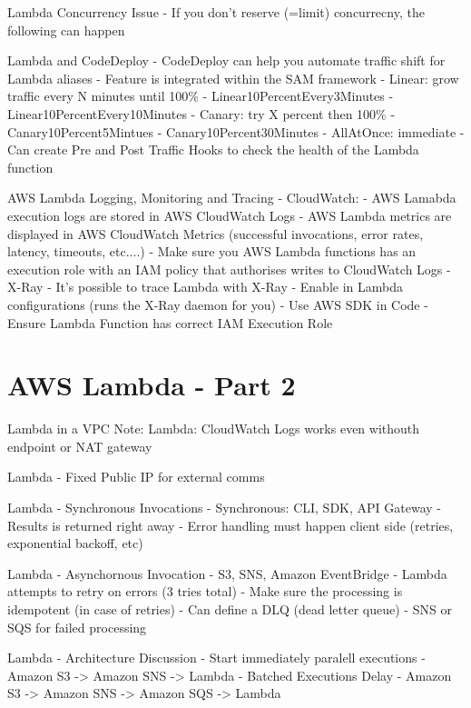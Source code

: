 \documentclass[11pt]{book}
\begin{document}
    Lambda Concurrency Issue
    - If you don't reserve (=limit) concurrecny, the following can happen

    Lambda and CodeDeploy
    - CodeDeploy can help you automate traffic shift for Lambda aliases
    - Feature is integrated within the SAM framework
    - Linear: grow traffic every N minutes until 100\%
        - Linear10PercentEvery3Minutes
        - Linear10PercentEvery10Minutes
    - Canary: try X percent then 100\%
        - Canary10Percent5Mintues
        - Canary10Percent30Minutes
    - AllAtOnce: immediate
    - Can create Pre and Post Traffic Hooks to check the health of the Lambda function

    AWS Lambda Logging, Monitoring and Tracing
    - CloudWatch:
        - AWS Lamabda execution logs are stored in AWS CloudWatch Logs
        - AWS Lambda metrics are displayed in AWS CloudWatch Metrics (successful invocations, error rates, latency, timeouts, etc....)
        - Make sure you AWS Lambda functions has an execution role with an IAM policy that authorises writes to CloudWatch Logs
    - X-Ray
        - It's possible to trace Lambda with X-Ray
        - Enable in Lambda configurations (runs the X-Ray daemon for you)
        - Use AWS SDK in Code
        - Ensure Lambda Function has correct IAM Execution Role

    \section{AWS Lambda - Part 2}
    Lambda in a VPC
    Note: Lambda: CloudWatch Logs works even withouth endpoint or NAT gateway

    Lambda - Fixed Public IP for external comms

    Lambda - Synchronous Invocations
    - Synchronous: CLI, SDK, API Gateway
        - Results is returned right away
        - Error handling must happen client side (retries, exponential backoff, etc)

    Lambda - Asynchornous Invocation
    - S3, SNS, Amazon EventBridge
    - Lambda attempts to retry on errors (3 tries total)
    - Make sure the processing is idempotent (in case of retries)
    - Can define a DLQ (dead letter queue) - SNS or SQS for failed processing

    Lambda - Architecture Discussion
    - Start immediately paralell executions
        - Amazon S3 -> Amazon SNS -> Lambda
    - Batched Executions Delay
        - Amazon S3 -> Amazon SNS -> Amazon SQS -> Lambda
\end{document}

